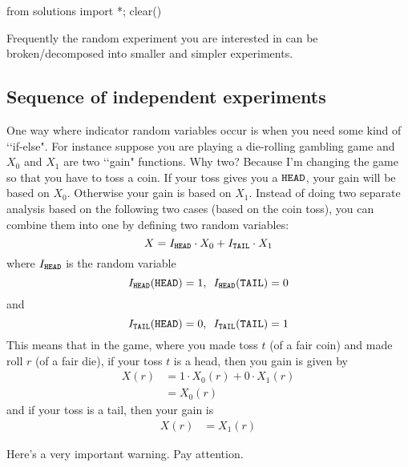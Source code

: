 \begin{python0}
from solutions import *; clear()
\end{python0}


Frequently the random experiment you are interested in
can be broken/decomposed into smaller and simpler
experiments.


\subsection{Sequence of independent experiments}

One way where indicator random variables
occur is when you need some kind of
\lq\lq if-else".
For instance suppose you are
playing a die-rolling gambling game
and $X_0$ and $X_1$ are two \lq\lq gain" functions.
Why two?
Because I'm changing the game
so that
you have to toss a coin.
If your toss gives you a $\texttt{HEAD}$,
your gain will be
based on $X_0$.
Otherwise your gain is based on
$X_1$.
Instead of doing two separate
analysis based on the following two cases
(based on the coin toss),
you can combine them into one
by defining two random variables:
\[
  X = I_{\texttt{HEAD}} \cdot X_0 + I_{\texttt{TAIL}} \cdot X_1
\]
where $I_{\texttt{HEAD}}$ is the random variable
\[
  I_{\texttt{HEAD}}(\texttt{HEAD}) = 1, \,\,\,
  I_{\texttt{HEAD}}(\texttt{TAIL}) = 0
\]
and
\[
  I_{\texttt{TAIL}}(\texttt{HEAD}) = 0, \,\,\,
  I_{\texttt{TAIL}}(\texttt{TAIL}) = 1
\]
This means that in the game,
where you made toss $t$ (of a fair coin) and made roll $r$ (of a fair die),
if your toss $t$ is a head, then
you gain is given by 
\begin{align*}
  X(r)
  &= 1 \cdot X_0(r) +
    0 \cdot X_1(r)
  \\
  &= X_0(r)
\end{align*}
and if your toss is a tail, then your gain is
\begin{align*}
  X(r)
  &= X_1(r)
\end{align*}

Here's a very important warning.
Pay attention.

